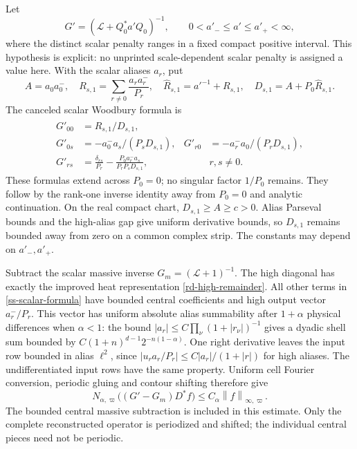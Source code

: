 \documentclass[11pt]{article}
\theoremstyle{remark}
\newcommand{\norm}[1]{\left\|#1\right\|}
\begin{document}
Let
\[
 G'=(\mathcal L+Q_0^*a'Q_0)^{-1},\qquad
              0<a'_-\le a'\le a'_+<\infty,
\]
where the distinct scalar penalty ranges in a fixed compact
positive interval. This hypothesis is explicit: no unprinted
scale-dependent scalar penalty is assigned a value here.
With the scalar aliases $a_r$, put
\begin{equation}\label{ss-scalar-denominator}
 A=a_0a_0^-,\quad
 R_{s,1}=\sum_{r\ne0}\frac{a_ra_r^-}{P_r},\quad
 \widehat R_{s,1}=a'^{-1}+R_{s,1},\quad
 D_{s,1}=A+P_0\widehat R_{s,1}.
\end{equation}
The canceled scalar Woodbury formula is
\begin{align}
 G'_{00}&=\widehat R_{s,1}/D_{s,1},\nonumber\\
 G'_{0s}&=-a_0^-a_s/(P_sD_{s,1}),
 &G'_{r0}&=-a_r^-a_0/(P_rD_{s,1}),\nonumber\\
 G'_{rs}&=\frac{\delta_{rs}}{P_r}
       -\frac{P_0a_r^-a_s}{P_rP_sD_{s,1}},
 &&r,s\ne0.
 \label{ss-scalar-formula}
\end{align}
These formulas extend across $P_0=0$; no singular factor $1/P_0$
remains. They follow by the rank-one inverse identity away from
$P_0=0$ and analytic continuation. On the real compact chart,
$D_{s,1}\ge A\ge c>0$. Alias Parseval bounds and the high-alias
gap give uniform derivative bounds, so $D_{s,1}$ remains bounded
away from zero on a common complex strip. The constants may
depend on $a'_-,a'_+$.

Subtract the scalar massive inverse $G_m=(\mathcal L+1)^{-1}$.
The high diagonal has exactly the improved heat representation
\eqref{rd-high-remainder}. All other terms in
\eqref{ss-scalar-formula} have bounded central coefficients and
high output vector $a_r^-/P_r$. This vector has uniform absolute
alias summability after $1+\alpha$ physical differences when
$\alpha<1$: the bound
$|a_r|\le C\prod_\nu(1+|r_\nu|)^{-1}$ gives a dyadic shell sum
bounded by $C(1+n)^{d-1}2^{-n(1-\alpha)}$. One right derivative
leaves the input row bounded in alias $\ell^2$, since
$|u_ra_r/P_r|\le C|a_r|/(1+|r|)$ for high aliases.
The undifferentiated input rows have the same property.
Uniform cell Fourier conversion, periodic gluing and contour
shifting therefore give
\begin{equation}\label{ss-scalar-remainder}
 N_{\alpha,\varpi}\bigl((G'-G_m)D^*f\bigr)
       \le C_\alpha\norm{f}_{\infty,\varpi}.
\end{equation}
The bounded central massive subtraction is included in this
estimate. Only the complete reconstructed operator is periodized
and shifted; the individual central pieces need not be periodic.
\end{document}
